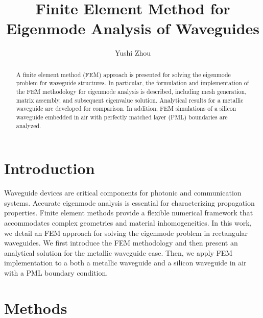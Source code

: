 \documentclass[10pt,letterpaper]{article}
\title{\bf Finite Element Method for Eigenmode Analysis of Waveguides}
\author[1]{Yushi Zhou}
\affil[1]{Department of Electrical and Computer Engineering}
\date{}
\begin{document}
\maketitle
\thispagestyle{empty}

\begin{abstract}
A finite element method (FEM) approach is presented for solving the 
eigenmode problem for waveguide structures. In particular, 
the formulation and implementation of the FEM methodology
 for eigenmode analysis is described, including mesh generation, matrix assembly, 
 and subsequent eigenvalue solution. Analytical results for a metallic 
 waveguide are developed for comparison. In addition, FEM simulations of
  a silicon waveguide embedded in air with perfectly matched layer (PML) 
  boundaries are analyzed. 
\end{abstract}

\section*{Introduction}
Waveguide devices are critical components for photonic and communication systems.
 Accurate eigenmode analysis is essential for characterizing propagation 
 properties. Finite element methods provide a flexible numerical framework
 that accommodates complex geometries and material inhomogeneities. 
 In this work, we detail an FEM approach for solving the eigenmode 
 problem in rectangular waveguides. We first introduce the FEM methodology 
 and then present an analytical solution for the metallic waveguide case. 
 Then, we apply FEM implementation to a both a metallic waveguide and
 a silicon waveguide in air 
 with a PML boundary condition.

\section*{Methods}
\end{document}
